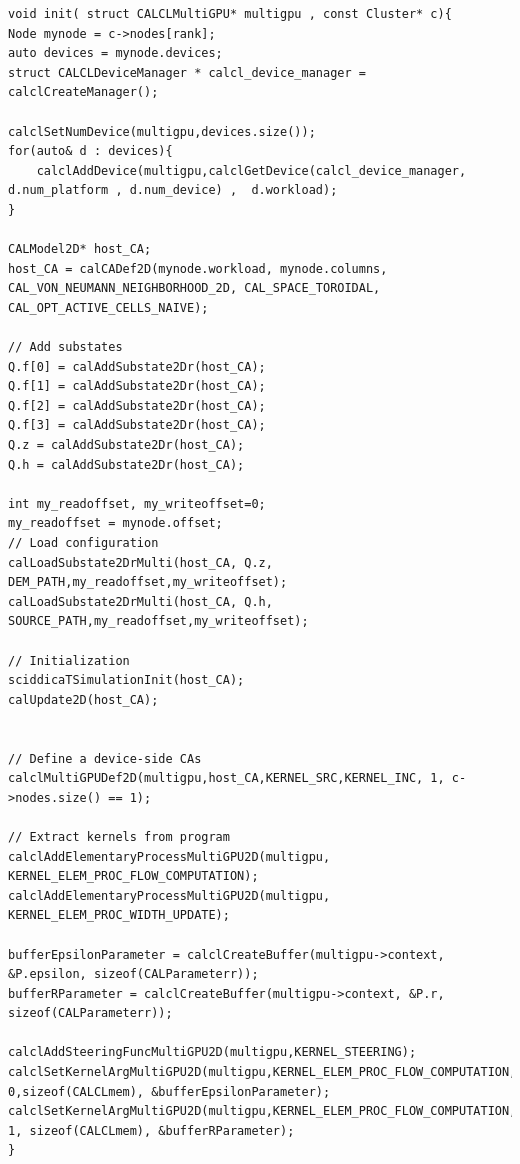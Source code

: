 \begin{lstlisting}
void init( struct CALCLMultiGPU* multigpu , const Cluster* c){
Node mynode = c->nodes[rank];
auto devices = mynode.devices;
struct CALCLDeviceManager * calcl_device_manager = calclCreateManager();

calclSetNumDevice(multigpu,devices.size());
for(auto& d : devices){
    calclAddDevice(multigpu,calclGetDevice(calcl_device_manager, d.num_platform , d.num_device) ,  d.workload);
}

CALModel2D* host_CA;
host_CA = calCADef2D(mynode.workload, mynode.columns, CAL_VON_NEUMANN_NEIGHBORHOOD_2D, CAL_SPACE_TOROIDAL, CAL_OPT_ACTIVE_CELLS_NAIVE);

// Add substates
Q.f[0] = calAddSubstate2Dr(host_CA);
Q.f[1] = calAddSubstate2Dr(host_CA);
Q.f[2] = calAddSubstate2Dr(host_CA);
Q.f[3] = calAddSubstate2Dr(host_CA);
Q.z = calAddSubstate2Dr(host_CA);
Q.h = calAddSubstate2Dr(host_CA);

int my_readoffset, my_writeoffset=0;
my_readoffset = mynode.offset;
// Load configuration
calLoadSubstate2DrMulti(host_CA, Q.z, DEM_PATH,my_readoffset,my_writeoffset);
calLoadSubstate2DrMulti(host_CA, Q.h, SOURCE_PATH,my_readoffset,my_writeoffset);

// Initialization
sciddicaTSimulationInit(host_CA);
calUpdate2D(host_CA);


// Define a device-side CAs
calclMultiGPUDef2D(multigpu,host_CA,KERNEL_SRC,KERNEL_INC, 1, c->nodes.size() == 1);

// Extract kernels from program
calclAddElementaryProcessMultiGPU2D(multigpu, KERNEL_ELEM_PROC_FLOW_COMPUTATION);
calclAddElementaryProcessMultiGPU2D(multigpu, KERNEL_ELEM_PROC_WIDTH_UPDATE);

bufferEpsilonParameter = calclCreateBuffer(multigpu->context, &P.epsilon, sizeof(CALParameterr));
bufferRParameter = calclCreateBuffer(multigpu->context, &P.r, sizeof(CALParameterr));

calclAddSteeringFuncMultiGPU2D(multigpu,KERNEL_STEERING);
calclSetKernelArgMultiGPU2D(multigpu,KERNEL_ELEM_PROC_FLOW_COMPUTATION, 0,sizeof(CALCLmem), &bufferEpsilonParameter);
calclSetKernelArgMultiGPU2D(multigpu,KERNEL_ELEM_PROC_FLOW_COMPUTATION, 1, sizeof(CALCLmem), &bufferRParameter);
}
\end{lstlisting}


